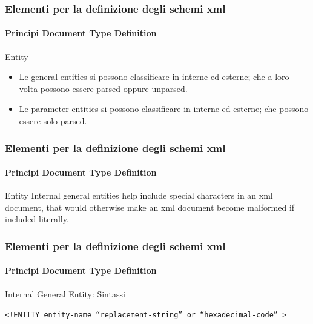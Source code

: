\begin{frame}
    \frametitle{Elementi per la definizione degli schemi xml}
    \framesubtitle{Principi Document Type Definition}
    \addtocounter{nframe}{1}

    \begin{block}{Entity}
    \begin{itemize}
        \item  Le general entities si possono classificare in interne ed esterne; che a loro volta possono essere parsed oppure unparsed.
        \item Le parameter entities si possono classificare in interne ed esterne; che  possono essere solo parsed.
    \end{itemize}
    \end{block}
    
\end{frame}

\begin{frame}
    \frametitle{Elementi per la definizione degli schemi xml}
    \framesubtitle{Principi Document Type Definition}
    \addtocounter{nframe}{1}

    \begin{block}{Entity}
     Internal general entities help include special characters in an xml document,
     that would otherwise make an xml document become malformed if included
     literally.
    \end{block}

\end{frame}

\begin{frame}
    \frametitle{Elementi per la definizione degli schemi xml}
    \framesubtitle{Principi Document Type Definition}
    \addtocounter{nframe}{1}

    \begin{block}{Internal General Entity: Sintassi}
    \begin{center}\texttt{<!ENTITY entity-name ``replacement-string'' or ``hexadecimal-code'' >}\end{center}
    \end{block}

\end{frame}


